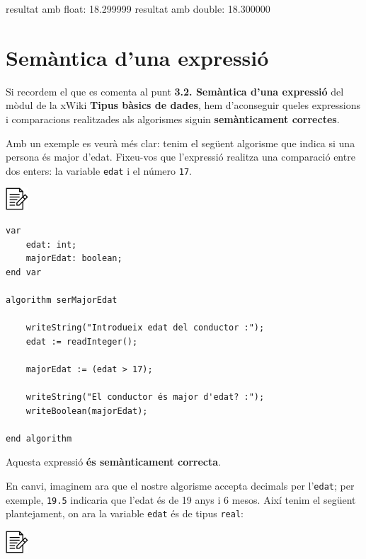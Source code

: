 \documentclass[]{book}
\newenvironment{Shaded}{\begin{snugshade}}{\end{snugshade}}
\newcommand{\DataTypeTok}[1]{\textcolor[rgb]{0.13,0.29,0.53}{#1}}
\newcommand{\FloatTok}[1]{\textcolor[rgb]{0.00,0.00,0.81}{#1}}
\newcommand{\NormalTok}[1]{#1}
\begin{document}
\begin{Shaded}
\begin{Highlighting}[]
\NormalTok{resultat amb  }\DataTypeTok{float}\NormalTok{: }\FloatTok{18.299999}
\NormalTok{resultat amb }\DataTypeTok{double}\NormalTok{: }\FloatTok{18.300000}
\end{Highlighting}
\end{Shaded}

\section{Semàntica d'una expressió}\label{semantica-duna-expressio}

Si recordem el que es comenta al punt \textbf{3.2. Semàntica d'una
expressió} del mòdul de la xWiki \textbf{Tipus bàsics de dades}, hem
d'aconseguir queles expressions i comparacions realitzades als
algorismes siguin \textbf{semànticament correctes}.

Amb un exemple es veurà més clar: tenim el següent algorisme que indica
si una persona és major d'edat. Fixeu-vos que l'expressió realitza una
comparació entre dos enters: la variable \texttt{edat} i el número
\texttt{17}.

\includegraphics{./img/alg.png}

\begin{verbatim}
var
    edat: int;
    majorEdat: boolean;
end var

algorithm serMajorEdat

    writeString("Introdueix edat del conductor :");
    edat := readInteger();

    majorEdat := (edat > 17);

    writeString("El conductor és major d'edat? :");
    writeBoolean(majorEdat);

end algorithm
\end{verbatim}

Aquesta expressió \textbf{és semànticament correcta}.

En canvi, imaginem ara que el nostre algorisme accepta decimals per
l'\texttt{edat}; per exemple, \texttt{19.5} indicaria que l'edat és de
19 anys i 6 mesos. Així tenim el següent plantejament, on ara la
variable \texttt{edat} és de tipus \texttt{real}:

\includegraphics{./img/alg.png}
\end{document}
